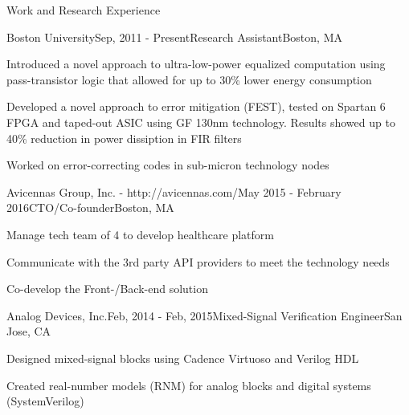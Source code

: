 \begin{rSection} {Work and Research Experience}
  \begin{rSubsection}{Boston University}{Sep, 2011 - Present}{Research Assistant}{Boston, MA}
  \item Introduced a novel approach to ultra-low-power equalized computation using pass-transistor logic that allowed for up to 30\% lower energy consumption
  \item Developed a novel approach to error mitigation (FEST), tested on Spartan 6 FPGA and taped-out ASIC using GF 130nm technology. Results showed up to 40\% reduction in power dissiption in FIR filters
  \item Worked on error-correcting codes in sub-micron technology nodes
  \end{rSubsection}
  \begin{rSubsection}{Avicennas Group, Inc. - http://avicennas.com/}{May 2015 - February 2016}{CTO/Co-founder}{Boston, MA}
  \item Manage tech team of 4 to develop healthcare platform
  \item Communicate with the 3rd party API providers to meet the technology needs
  \item Co-develop the Front-/Back-end solution
  \end{rSubsection}
  \begin{rSubsection}{Analog Devices, Inc.}{Feb, 2014 - Feb, 2015}{Mixed-Signal Verification Engineer}{San Jose, CA}
  \item Designed mixed-signal blocks using Cadence Virtuoso and Verilog HDL
  \item Created real-number models (RNM) for analog blocks and digital systems (SystemVerilog)

\end{rSubsection}
\end{rSection}
